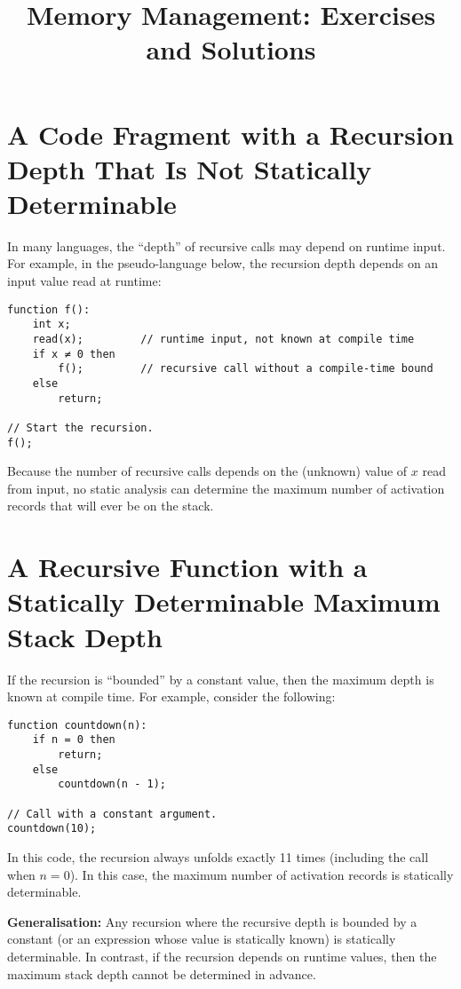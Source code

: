 \documentclass{article}
\title{Memory Management: Exercises and Solutions}
\author{}
\date{}
\begin{document}
\maketitle

\section{A Code Fragment with a Recursion Depth That Is Not Statically Determinable}
In many languages, the ``depth'' of recursive calls may depend on runtime input. For example, in the pseudo-language below, the recursion depth depends on an input value read at runtime:

\begin{verbatim}
function f():
    int x;
    read(x);         // runtime input, not known at compile time
    if x ≠ 0 then
        f();         // recursive call without a compile-time bound
    else
        return;
        
// Start the recursion.
f();
\end{verbatim}

Because the number of recursive calls depends on the (unknown) value of \(x\) read from input, no static analysis can determine the maximum number of activation records that will ever be on the stack.

\section{A Recursive Function with a Statically Determinable Maximum Stack Depth}
If the recursion is ``bounded'' by a constant value, then the maximum depth is known at compile time. For example, consider the following:

\begin{verbatim}
function countdown(n):
    if n = 0 then
        return;
    else
        countdown(n - 1);
        
// Call with a constant argument.
countdown(10);
\end{verbatim}

In this code, the recursion always unfolds exactly 11 times (including the call when \(n = 0\)). In this case, the maximum number of activation records is statically determinable.

\textbf{Generalisation:} Any recursion where the recursive depth is bounded by a constant (or an expression whose value is statically known) is statically determinable. In contrast, if the recursion depends on runtime values, then the maximum stack depth cannot be determined in advance.
\end{document}
